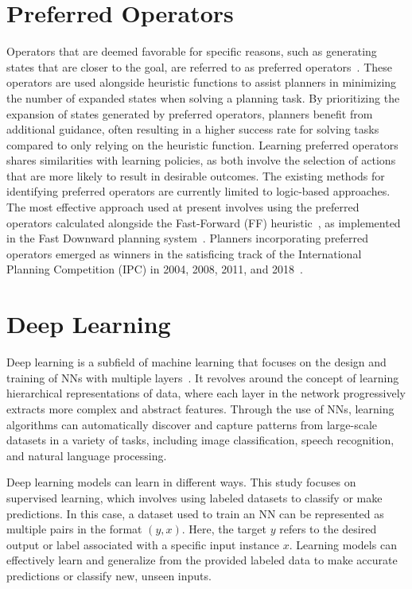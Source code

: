 \documentclass[ppgc,diss,english]{iiufrgs}
\begin{document}
\section{Preferred Operators}
\label{sec:intro-preferred-ops}
Operators that are deemed favorable for specific reasons, such as generating states that are closer to the goal, are referred to as preferred operators~\cite{Helmert/2006,Richter.Helmert/2009}. These operators are used alongside heuristic functions to assist planners in minimizing the number of expanded states when solving a planning task.
By prioritizing the expansion of states generated by preferred operators, planners benefit from additional guidance, often resulting in a higher success rate for solving tasks compared to only relying on the heuristic function. Learning preferred operators shares similarities with learning policies, as both involve the selection of actions that are more likely to result in desirable outcomes. The existing methods for identifying preferred operators are currently limited to logic-based approaches. The most effective approach used at present involves using the preferred operators calculated alongside the Fast-Forward (FF) heuristic~\cite{Hoffmann.Nebel/2001}, as implemented in the Fast Downward planning system~\cite{Helmert/2006}. Planners incorporating preferred operators emerged as winners in the satisficing track of the International Planning Competition (IPC) in 2004, 2008, 2011, and 2018~\cite{Helmert/2006,Richter.lama.etal/2011,Richter.lama.etal/2011,Seipp-fast.etal/2018}.

\section{Deep Learning}
\label{sec:intro-deep-learning}
Deep learning is a subfield of machine learning that focuses on the design and training of NNs with multiple layers~\cite{Goodfellow.etal/2016}. It revolves around the concept of learning hierarchical representations of data, where each layer in the network progressively extracts more complex and abstract features. Through the use of NNs, learning algorithms can automatically discover and capture patterns from large-scale datasets in a variety of tasks, including image classification, speech recognition, and natural language processing.

Deep learning models can learn in different ways. This study focuses on supervised learning, which involves using labeled datasets to classify or make predictions. In this case, a dataset used to train an NN can be represented as multiple pairs in the format $(y, x)$. Here, the target $y$ refers to the desired output or label associated with a specific input instance $x$. Learning models can effectively learn and generalize from the provided labeled data to make accurate predictions or classify new, unseen inputs.
\end{document}
